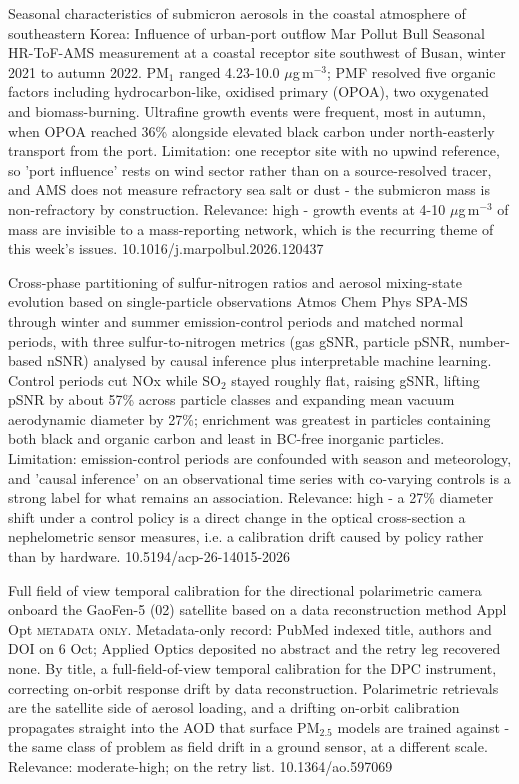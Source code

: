 \documentclass[10pt]{article}
\begin{document}
{Seasonal characteristics of submicron aerosols in the coastal atmosphere of southeastern Korea: Influence of urban-port outflow}
{Mar Pollut Bull}
{Seasonal HR-ToF-AMS measurement at a coastal receptor site southwest of Busan, winter 2021 to autumn 2022. PM$_{1}$ ranged 4.23-10.0 $\mu$g\,m$^{-3}$; PMF resolved five organic factors including hydrocarbon-like, oxidised primary (OPOA), two oxygenated and biomass-burning. Ultrafine growth events were frequent, most in autumn, when OPOA reached 36\% alongside elevated black carbon under north-easterly transport from the port. Limitation: one receptor site with no upwind reference, so 'port influence' rests on wind sector rather than on a source-resolved tracer, and AMS does not measure refractory sea salt or dust - the submicron mass is non-refractory by construction. Relevance: high - growth events at 4-10 $\mu$g\,m$^{-3}$ of mass are invisible to a mass-reporting network, which is the recurring theme of this week's issues.}
{10.1016/j.marpolbul.2026.120437}

{Cross-phase partitioning of sulfur-nitrogen ratios and aerosol mixing-state evolution based on single-particle observations}
{Atmos Chem Phys}
{SPA-MS through winter and summer emission-control periods and matched normal periods, with three sulfur-to-nitrogen metrics (gas gSNR, particle pSNR, number-based nSNR) analysed by causal inference plus interpretable machine learning. Control periods cut NOx while SO$_2$ stayed roughly flat, raising gSNR, lifting pSNR by about 57\% across particle classes and expanding mean vacuum aerodynamic diameter by 27\%; enrichment was greatest in particles containing both black and organic carbon and least in BC-free inorganic particles. Limitation: emission-control periods are confounded with season and meteorology, and 'causal inference' on an observational time series with co-varying controls is a strong label for what remains an association. Relevance: high - a 27\% diameter shift under a control policy is a direct change in the optical cross-section a nephelometric sensor measures, i.e. a calibration drift caused by policy rather than by hardware.}
{10.5194/acp-26-14015-2026}

{Full field of view temporal calibration for the directional polarimetric camera onboard the GaoFen-5 (02) satellite based on a data reconstruction method}
{Appl Opt}
{\textsc{metadata only.} Metadata-only record: PubMed indexed title, authors and DOI on 6 Oct; Applied Optics deposited no abstract and the retry leg recovered none. By title, a full-field-of-view temporal calibration for the DPC instrument, correcting on-orbit response drift by data reconstruction. Polarimetric retrievals are the satellite side of aerosol loading, and a drifting on-orbit calibration propagates straight into the AOD that surface PM$_{2.5}$ models are trained against - the same class of problem as field drift in a ground sensor, at a different scale. Relevance: moderate-high; on the retry list.}
{10.1364/ao.597069}
\end{document}
